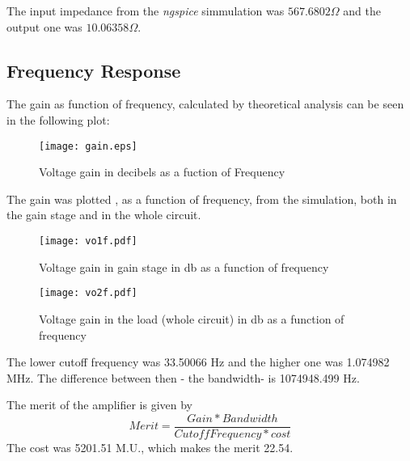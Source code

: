 The input impedance from the \textit{ngspice} simmulation was $567.6802 \Omega$ and the output one was $10.06358\Omega$.

\subsection{Frequency Response}
The gain as function of frequency, calculated by theoretical analysis can be seen in the following plot:
\begin{figure}[H] \centering
\texttt{[image: gain.eps]}
\caption{Voltage gain in decibels as a fuction of Frequency }
\label{fig:vo}
\end{figure}

The gain was plotted , as a function of frequency, from the simulation, both in the gain stage and in the whole circuit.
\begin{figure}[H] \centering
  \texttt{[image: vo1f.pdf]}
\caption{Voltage gain in gain stage in db as a function of frequency}
\label{fig:rc1}
\end{figure}
\begin{figure}[H] \centering
  \texttt{[image: vo2f.pdf]}
\caption{Voltage gain in the load (whole circuit) in db as a function of frequency}
\label{fig:rc1}
\end{figure}
The lower cutoff frequency was 33.50066 Hz and the higher one was 1.074982 MHz. The difference between then - the bandwidth- is 1074948.499 Hz.






The merit of the amplifier is given by 
\begin{equation}
    Merit=\frac{Gain*Bandwidth}{CutoffFrequency*cost}
\end{equation}
The cost was 5201.51 M.U., which makes the merit 22.54.
